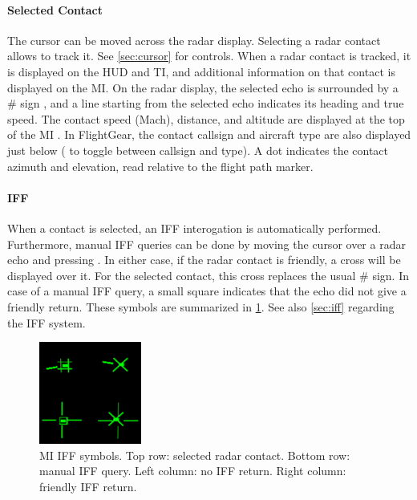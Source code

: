 \paragraph{Selected Contact}
The cursor  can be moved across the radar display.
Selecting a radar contact allows to track it. See \cref{sec:cursor} for controls.
When a radar contact is tracked, it is displayed on the HUD and TI,
and additional information on that contact is displayed on the MI.
On the radar display, the selected echo is surrounded by a \# sign ,
and a line starting from the selected echo indicates its heading and true speed.
The contact speed (Mach), distance, and altitude are displayed
at the top of the MI .
In FlightGear, the contact callsign and aircraft type are also displayed just below
( to toggle between callsign and type).
A dot  indicates the contact azimuth and elevation,
read relative to the flight path marker.

\paragraph{IFF}
When a contact is selected, an IFF interogation is automatically performed.
Furthermore, manual IFF queries can be done by moving the cursor over a radar echo and pressing .
In either case, if the radar contact is friendly, a cross will be displayed over it.
For the selected contact, this cross replaces the usual \# sign.
In case of a manual IFF query, a small square indicates that the echo did not give a friendly return.
These symbols are summarized in \cref{fig:mi-iff}.
See also \cref{sec:iff} regarding the IFF system.

\begin{figure}
  \centering
  \includegraphics[width=0.3\textwidth]{images/displays/MI-iff.png}

  \caption{MI IFF symbols.
    Top row: selected radar contact. Bottom row: manual IFF query.
    Left column: no IFF return. Right column: friendly IFF return.
  }
  \label{fig:mi-iff}
\end{figure}

